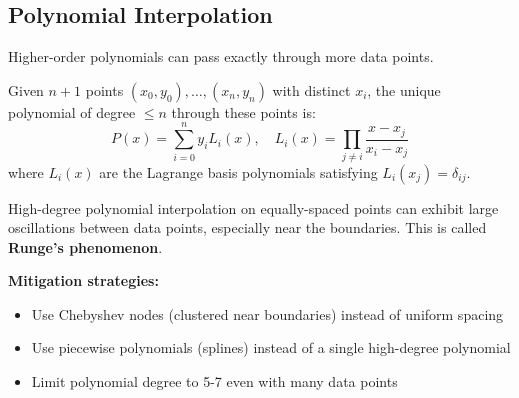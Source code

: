 \subsection{Polynomial Interpolation}

Higher-order polynomials can pass exactly through more data points.

\begin{definitionbox}[title=Definition 11.16: Lagrange Interpolation]
Given $n+1$ points $(x_0, y_0), \ldots, (x_n, y_n)$ with distinct $x_i$, the unique polynomial of degree $\leq n$ through these points is:
\begin{equation}
P(x) = \sum_{i=0}^{n} y_i L_i(x), \quad L_i(x) = \prod_{j \neq i} \frac{x - x_j}{x_i - x_j}
\end{equation}
where $L_i(x)$ are the Lagrange basis polynomials satisfying $L_i(x_j) = \delta_{ij}$.
\end{definitionbox}

\begin{warningbox}[title=Runge's Phenomenon]
High-degree polynomial interpolation on equally-spaced points can exhibit large oscillations between data points, especially near the boundaries. This is called \textbf{Runge's phenomenon}.

\textbf{Mitigation strategies:}
\begin{itemize}
    \item Use Chebyshev nodes (clustered near boundaries) instead of uniform spacing
    \item Use piecewise polynomials (splines) instead of a single high-degree polynomial
    \item Limit polynomial degree to 5-7 even with many data points
\end{itemize}
\end{warningbox}


